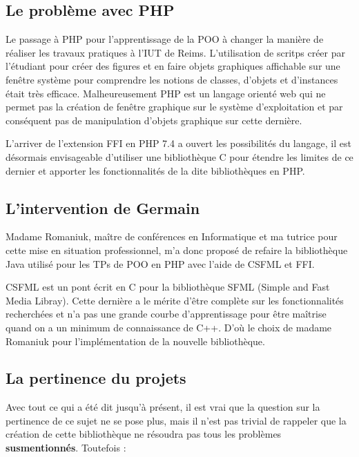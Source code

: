 \documentclass[11pt,a4paper,krantz2,11pt,oneside]{krantz}
\begin{document}
\hypertarget{le-probluxe8me-avec-php}{%
\subsection{Le problème avec PHP}\label{le-probluxe8me-avec-php}}

Le passage à PHP pour l'apprentissage de la POO à changer la manière de réaliser les travaux pratiques à l'IUT de Reims. L'utilisation de scritps créer par l'étudiant pour créer des figures et en faire objets graphiques affichable sur une fenêtre système pour comprendre les notions de classes, d'objets et d'instances était très efficace. Malheureusement PHP est un langage orienté web qui ne permet pas la création de fenêtre graphique sur le système d'exploitation et par conséquent pas de manipulation d'objets graphique sur cette dernière.

L'arriver de l'extension FFI en PHP 7.4 a ouvert les possibilités du langage, il est désormais envisageable d'utiliser une bibliothèque C pour étendre les limites de ce dernier et apporter les fonctionnalités de la dite bibliothèques en PHP.

\hypertarget{lintervention-de-germain}{%
\subsection{L'intervention de Germain}\label{lintervention-de-germain}}

Madame Romaniuk, maître de conférences en Informatique et ma tutrice pour cette mise en situation professionnel, m'a donc proposé de refaire la bibliothèque Java utilisé pour les TPs de POO en PHP avec l'aide de CSFML et FFI.

CSFML est un pont écrit en C pour la bibliothèque SFML (Simple and Fast Media Libray). Cette dernière a le mérite d'être complète sur les fonctionnalités recherchées et n'a pas une grande courbe d'apprentissage pour être maîtrise quand on a un minimum de connaissance de C++. D'où le choix de madame Romaniuk pour l'implémentation de la nouvelle bibliothèque.

\hypertarget{la-pertinence-du-projets}{%
\subsection{La pertinence du projets}\label{la-pertinence-du-projets}}

Avec tout ce qui a été dit jusqu'à présent, il est vrai que la question sur la pertinence de ce sujet ne se pose plus, mais il n'est pas trivial de rappeler que la création de cette bibliothèque ne résoudra pas tous les problèmes \textbf{susmentionnés}. Toutefois :
\end{document}
